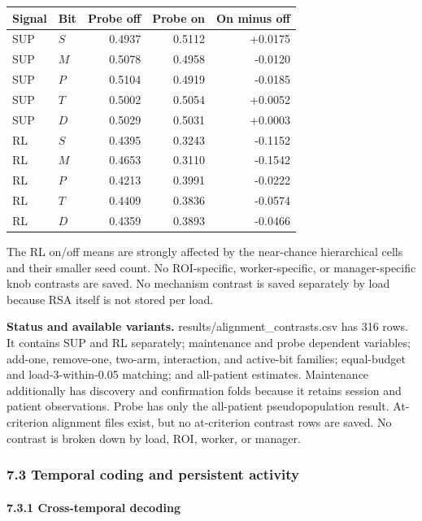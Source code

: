 \documentclass[
  10pt,
]{article}
\begin{document}
\begin{longtable}[]{@{}llrrr@{}}
\toprule\noalign{}
Signal & Bit & Probe off & Probe on & On minus off \\
\midrule\noalign{}
\endhead
\bottomrule\noalign{}
\endlastfoot
SUP & \(S\) & 0.4937 & 0.5112 & +0.0175 \\
SUP & \(M\) & 0.5078 & 0.4958 & -0.0120 \\
SUP & \(P\) & 0.5104 & 0.4919 & -0.0185 \\
SUP & \(T\) & 0.5002 & 0.5054 & +0.0052 \\
SUP & \(D\) & 0.5029 & 0.5031 & +0.0003 \\
RL & \(S\) & 0.4395 & 0.3243 & -0.1152 \\
RL & \(M\) & 0.4653 & 0.3110 & -0.1542 \\
RL & \(P\) & 0.4213 & 0.3991 & -0.0222 \\
RL & \(T\) & 0.4409 & 0.3836 & -0.0574 \\
RL & \(D\) & 0.4359 & 0.3893 & -0.0466 \\
\end{longtable}

The RL on/off means are strongly affected by the near-chance
hierarchical cells and their smaller seed count. No ROI-specific,
worker-specific, or manager-specific knob contrasts are saved. No
mechanism contrast is saved separately by load because RSA itself is not
stored per load.

\textbf{Status and available variants.} results/alignment\_contrasts.csv
has 316 rows. It contains SUP and RL separately; maintenance and probe
dependent variables; add-one, remove-one, two-arm, interaction, and
active-bit families; equal-budget and load-3-within-0.05 matching; and
all-patient estimates. Maintenance additionally has discovery and
confirmation folds because it retains session and patient observations.
Probe has only the all-patient pseudopopulation result. At-criterion
alignment files exist, but no at-criterion contrast rows are saved. No
contrast is broken down by load, ROI, worker, or manager.

\hypertarget{temporal-coding-and-persistent-activity}{%
\subsubsection{7.3 Temporal coding and persistent
activity}\label{temporal-coding-and-persistent-activity}}

\hypertarget{cross-temporal-decoding}{%
\paragraph{7.3.1 Cross-temporal
decoding}\label{cross-temporal-decoding}}
\end{document}
